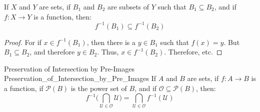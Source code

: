     \begin{theorem}
        If $X$ and $Y$ are sets, if $B_{1}$ and $B_{2}$ are subsets of
        $Y$ such that $B_{1}\subseteq{B}_{2}$, and if $f:X\rightarrow{Y}$
        is a function, then:
        \begin{equation}
            f^{-1}(B_{1})\subseteq{f^{-1}}(B_{2})
        \end{equation}
    \end{theorem}
    \begin{proof}
        For if $x\in{f}^{-1}(B_{1})$, then there is a
        $y\in{B}_{1}$ such that $f(x)=y$. But
        $B_{1}\subseteq{B}_{2}$, and therefore $y\in{B}_{2}$.
        Thus, $x\in{f}^{-1}(B_{2})$. Therefore, etc.
    \end{proof}
    \begin{ftheorem}{Preservation of Intersection by Pre-Images}
                    {Preservation_of_Intersection_by_Pre_Images}
        If $A$ and $B$ are sets, if $f:A\rightarrow{B}$ is a function, if
        $\mathcal{P}(B)$ is the power set of $B$, and if
        $\mathcal{O}\subseteq\mathcal{P}(B)$, then:
        \begin{equation*}
            f^{\minus{1}}\Big(
                \bigcap_{\mathcal{U}\in\mathcal{O}}\mathcal{U}\Big)
            =\bigcap_{\mathcal{U}\in\mathcal{O}}f^{\minus{1}}(\mathcal{U})
        \end{equation*}
    \end{ftheorem}
